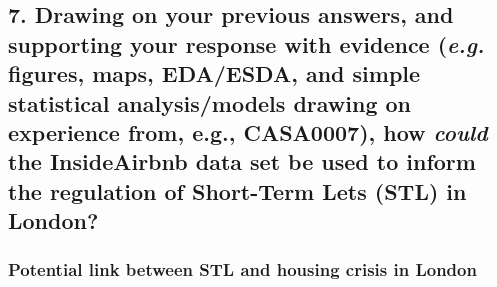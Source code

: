 \documentclass[
  a4paper,
  DIV=11,
  numbers=noendperiod]{scrartcl}
\begin{document}
\subsection{\texorpdfstring{7. Drawing on your previous answers, and
supporting your response with evidence (\emph{e.g.} figures, maps,
EDA/ESDA, and simple statistical analysis/models drawing on experience
from, e.g., CASA0007), how \emph{could} the InsideAirbnb data set be
used to inform the regulation of Short-Term Lets (STL) in
London?}{7. Drawing on your previous answers, and supporting your response with evidence (e.g. figures, maps, EDA/ESDA, and simple statistical analysis/models drawing on experience from, e.g., CASA0007), how could the InsideAirbnb data set be used to inform the regulation of Short-Term Lets (STL) in London?}}\label{drawing-on-your-previous-answers-and-supporting-your-response-with-evidence-e.g.-figures-maps-edaesda-and-simple-statistical-analysismodels-drawing-on-experience-from-e.g.-casa0007-how-could-the-insideairbnb-data-set-be-used-to-inform-the-regulation-of-short-term-lets-stl-in-london}

\subsubsection{Potential link between STL and housing crisis in
London}\label{potential-link-between-stl-and-housing-crisis-in-london}
\end{document}
